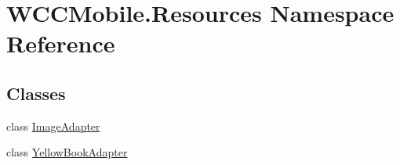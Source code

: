 \hypertarget{namespace_w_c_c_mobile_1_1_resources}{}\section{W\+C\+C\+Mobile.\+Resources Namespace Reference}
\label{namespace_w_c_c_mobile_1_1_resources}
\subsection*{Classes}
\begin{DoxyCompactItemize}
\item 
class \hyperlink{class_w_c_c_mobile_1_1_resources_1_1_image_adapter}{Image\+Adapter}
\item 
class \hyperlink{class_w_c_c_mobile_1_1_resources_1_1_yellow_book_adapter}{Yellow\+Book\+Adapter}
\end{DoxyCompactItemize}

